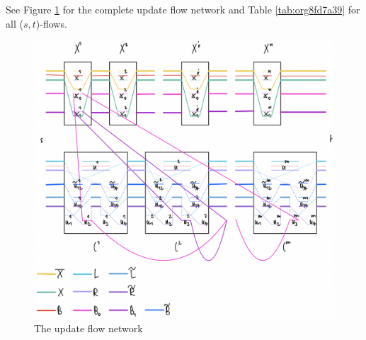 \documentclass[fontsize=11pt,paper=a4]{book}
\begin{document}
See Figure \ref{fig:org09fc6f6} for the complete update flow network and Table \ref{tab:org8fd7a39} for all (\(s,t\))-flows.

\begin{figure}[htbp]
\centering
\includegraphics[width=.9\linewidth]{../assets/Screen Shot 2023-02-14 at 15.08.01.png}
\caption{\label{fig:org09fc6f6}The update flow network}
\end{figure}
\end{document}
